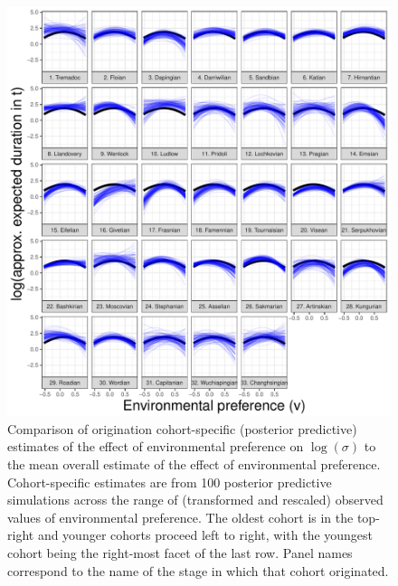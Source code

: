 \documentclass{article}
\begin{document}
\begin{figure}[ht]
  \centering
  \includegraphics[width = \textwidth,height = 0.8\textheight,keepaspectratio=true]{figure/env_cohort_1}
  \caption{Comparison of origination cohort-specific (posterior predictive) estimates of the effect of environmental preference on \(\log(\sigma)\) to the mean overall estimate of the effect of environmental preference. Cohort-specific estimates are from 100 posterior predictive simulations across the range of (transformed and rescaled) observed values of environmental preference. The oldest cohort is in the top-right and younger cohorts proceed left to right, with the youngest cohort being the right-most facet of the last row. Panel names correspond to the name of the stage in which that cohort originated.}
  \label{fig:env_cohort_low}
\end{figure}
\end{document}
